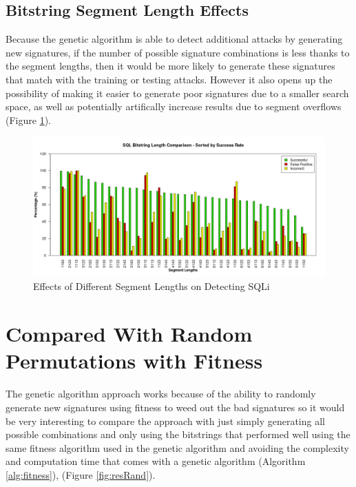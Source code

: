 \newpage
\subsection{Bitstring Segment Length Effects}

Because the genetic algorithm is able to detect additional attacks by generating new signatures, if the number of possible signature combinations is less thanks to the segment lengths, then it would be more likely to generate these signatures that match with the training or testing attacks.  However it also opens up the possibility of making it easier to generate poor signatures due to a smaller search space, as well as potentially artifically increase results due to segment overflows (Figure \ref{fig:resLength}).

\begin{figure}[hb]
	\centering
	\includegraphics[width=450px]{./assets/results/ga/bitlength/Results_SuccessRate_SQL.png}
	\caption{Effects of Different Segment Lengths on Detecting SQLi}
	\label{fig:resLength}
\end{figure}

\newpage
\section{Compared With Random Permutations with Fitness}

The genetic algorithm approach works because of the ability to randomly generate new signatures using fitness to weed out the bad signatures so it would be very interesting to compare the approach with just simply generating all possible combinations and only using the bitstrings that performed well using the same fitness algorithm used in the genetic algorithm and avoiding the complexity and computation time that comes with a genetic algorithm (Algorithm \ref{alg:fitness}), (Figure \ref{fig:resRand}).


